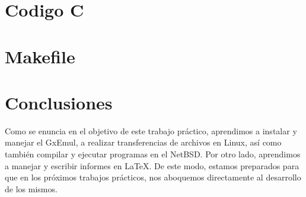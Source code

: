 \documentclass[a4paper,10pt,oneside]{article}
\newcommand{\captionlisting}[2][]{%
}
\begin{document}
	\newpage
\appendix
\section{Codigo C}

\captionlisting{../arg_parse.h}
\captionlisting{../arg_parse.c}

\captionlisting{../base_64.h}
\captionlisting{../base_64.c}

\captionlisting{../main.c}
\newpage
\section{Makefile}



\newpage
\section{Conclusiones}	
	Como se enuncia en el objetivo de este trabajo práctico, aprendimos a instalar y manejar el GxEmul, a realizar transferencias de archivos en Linux, así como también compilar y ejecutar programas en el NetBSD. Por otro lado,  aprendimos a manejar y escribir informes en \LaTeX{}.
	De este modo, estamos preparados para que en los próximos trabajos prácticos, nos aboquemos directamente al desarrollo de los mismos.
\end{document}
